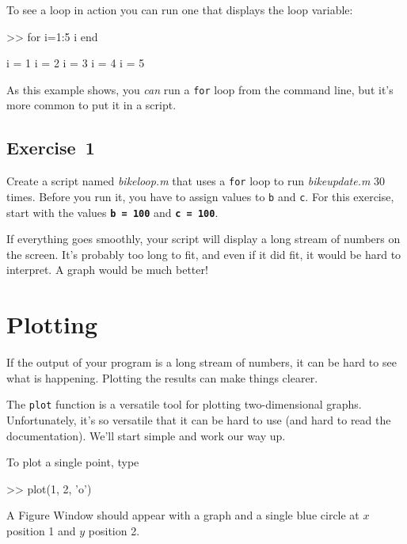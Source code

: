 
To see a loop in action you can run one that displays the
loop variable:

\begin{code}
>> for i=1:5
    i
end

i = 1
i = 2
i = 3
i = 4
i = 5
\end{code}

As this example shows, you \emph{can} run a \lstinline{for} loop from the
command line, but it's more common to put it in a script.

\subsection{Exercise~1}
Create a script named \emph{bike\textunderscore loop.m} that uses a \lstinline{for} loop to run \emph{bike\textunderscore update.m} 30 times.  Before you run it, you have to assign values to \lstinline{b} and \lstinline{c}.
For this exercise, start with the values \textbf{\lstinline{b = 100}} and \textbf{\lstinline{c = 100}}.

If everything goes smoothly, your script will display a long stream
of numbers on the screen.  It's probably too long
to fit, and even if it did fit, it would be hard to interpret.
A graph would be much better!



\section{Plotting}
\label{plotting}


If the output of your program is a long stream of numbers, it can be hard to see what is happening.
Plotting the results can make things clearer.

The \lstinline{plot} function is a versatile tool for plotting two-dimensional graphs.  Unfortunately, it's so versatile that it can be hard to use (and hard to read the documentation).
We'll start simple and work our way up.

To plot a single point, type

\begin{code}
>> plot(1, 2, 'o')
\end{code}

A Figure Window should appear with a graph and a single blue circle at $x$ position 1 and $y$ position 2.  


